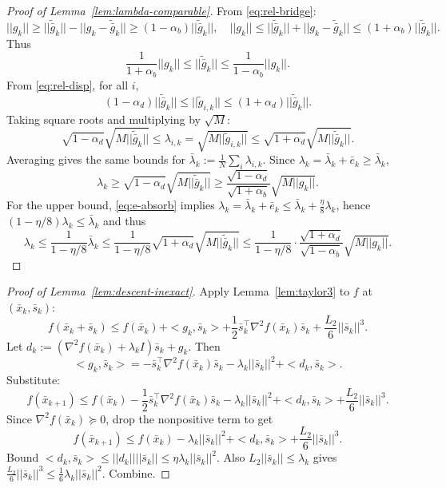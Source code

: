 \documentclass[11pt,a4paper]{article}
\def\norm#1{||#1||}%
\def\ip#1#2{<#1,#2>}%
\newcommand{\ip}[2]{\left\langle #1,#2\right\rangle}
\newcommand{\norm}[1]{\left\|#1\right\|}
\begin{document}
	\begin{proof}[Proof of Lemma~\ref{lem:lambda-comparable}]
		From \eqref{eq:rel-bridge}:
		\[
		\norm{g_k}\ge \norm{\tilde{\bar g}_k}-\norm{g_k-\tilde{\bar g}_k}\ge (1-\alpha_b)\norm{\tilde{\bar g}_k},
		\quad
		\norm{g_k}\le \norm{\tilde{\bar g}_k}+\norm{g_k-\tilde{\bar g}_k}\le (1+\alpha_b)\norm{\tilde{\bar g}_k}.
		\]
		Thus
		\[
		\frac{1}{1+\alpha_b}\norm{g_k}\le \norm{\tilde{\bar g}_k}\le \frac{1}{1-\alpha_b}\norm{g_k}.
		\]
		From \eqref{eq:rel-disp}, for all $i$,
		\[
		(1-\alpha_d)\norm{\tilde{\bar g}_k}\le \norm{\tilde g_{i,k}}\le (1+\alpha_d)\norm{\tilde{\bar g}_k}.
		\]
		Taking square roots and multiplying by $\sqrt{M}$:
		\[
		\sqrt{1-\alpha_d}\sqrt{M\norm{\tilde{\bar g}_k}}\le \lambda_{i,k}=\sqrt{M\norm{\tilde g_{i,k}}}
		\le \sqrt{1+\alpha_d}\sqrt{M\norm{\tilde{\bar g}_k}}.
		\]
		Averaging gives the same bounds for $\bar\lambda_k:=\frac1N\sum_i\lambda_{i,k}$.
		Since $\lambda_k=\bar\lambda_k+\bar e_k\ge \bar\lambda_k$,
		\[
		\lambda_k\ge \sqrt{1-\alpha_d}\sqrt{M\norm{\tilde{\bar g}_k}}
		\ge \frac{\sqrt{1-\alpha_d}}{\sqrt{1+\alpha_b}}\sqrt{M\norm{g_k}}.
		\]
		For the upper bound, \eqref{eq:e-absorb} implies
		$\lambda_k=\bar\lambda_k+\bar e_k\le \bar\lambda_k+\frac{\eta}{8}\lambda_k$,
		hence $(1-\eta/8)\lambda_k\le \bar\lambda_k$ and thus
		\[
		\lambda_k\le \frac{1}{1-\eta/8}\bar\lambda_k
		\le \frac{1}{1-\eta/8}\sqrt{1+\alpha_d}\sqrt{M\norm{\tilde{\bar g}_k}}
		\le \frac{1}{1-\eta/8}\cdot\frac{\sqrt{1+\alpha_d}}{\sqrt{1-\alpha_b}}\sqrt{M\norm{g_k}}.
		\]
	\end{proof}
	
	\begin{proof}[Proof of Lemma~\ref{lem:descent-inexact}]
		Apply Lemma~\ref{lem:taylor3} to $f$ at $(\bar x_k,\bar s_k)$:
		\[
		f(\bar x_k+\bar s_k)\le f(\bar x_k)+\ip{g_k}{\bar s_k}+\frac12\bar s_k^\top\nabla^2 f(\bar x_k)\bar s_k+\frac{L_2}{6}\norm{\bar s_k}^3.
		\]
		Let $d_k:=(\nabla^2 f(\bar x_k)+\lambda_k I)\bar s_k+g_k$.
		Then
		\[
		\ip{g_k}{\bar s_k}=-\bar s_k^\top\nabla^2 f(\bar x_k)\bar s_k-\lambda_k\norm{\bar s_k}^2+\ip{d_k}{\bar s_k}.
		\]
		Substitute:
		\[
		f(\bar x_{k+1})\le f(\bar x_k)-\frac12\bar s_k^\top\nabla^2 f(\bar x_k)\bar s_k-\lambda_k\norm{\bar s_k}^2+\ip{d_k}{\bar s_k}+\frac{L_2}{6}\norm{\bar s_k}^3.
		\]
		Since $\nabla^2 f(\bar x_k)\succeq 0$, drop the nonpositive term to get
		\[
		f(\bar x_{k+1})\le f(\bar x_k)-\lambda_k\norm{\bar s_k}^2+\ip{d_k}{\bar s_k}+\frac{L_2}{6}\norm{\bar s_k}^3.
		\]
		Bound $\ip{d_k}{\bar s_k}\le \norm{d_k}\norm{\bar s_k}\le \eta\lambda_k\norm{\bar s_k}^2$.
		Also $L_2\norm{\bar s_k}\le \lambda_k$ gives $\frac{L_2}{6}\norm{\bar s_k}^3\le \frac{1}{6}\lambda_k\norm{\bar s_k}^2$.
		Combine.
	\end{proof}
	
\end{document}
